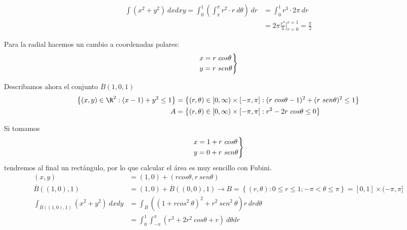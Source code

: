             \begin{sol}
                \begin{align*}
                    \label{}
                    \int (x^2 + y^2) \ dxdxy = \int_0^1 \left(  \int_{\pi}^{\pi} r^2 \cdot r \ d\theta \right) \ dr &= \int_0^1 r^3 \cdot 2\pi \ dr \\
                            &= 2\pi \frac{r^4}{4} \bigg\rbrack_{r=0}^{r=1} = \frac{\pi}{2}
                \end{align*}

                Para la radial hacemos un cambio a coordenadas polares: $$ \begin{rcases}
                    x = r \ cos \theta \\
                    y = r \ sen \theta
                \end{rcases}$$

                Describamos ahora el conjunto $\overline{B}(1, 0, 1)$ \begin{align*}
                    \label{}
                    \left\{ (x, y) \in \R^2 : (x-1) + y^2 \leq 1 \right\} &= \left\{ (r, \theta) \in [0, \infty) \times [-\pi, \pi] : (r \ cos \theta - 1)^2 + (r \ sen \theta)^2 \leq 1 \right\} \\
                        A &= \left\{ (r, \theta) \in [0, \infty) \times [-\pi, \pi] : r^2-2r \ cos \theta \leq 0 \right\}
                \end{align*}

                Si tomamos $$ \begin{rcases}
                    x = 1 + r \ cos \theta \\
                    y = 0 + r \ sen \theta
                \end{rcases}$$
                tendremos al final un rectángulo, por lo que calcular el área es muy sencillo con Fubini.
                \begin{align*}
                    \label{}
                    (x, y) &= (1, 0) + (r cos \theta, r \ sen \theta) \\
                    \overline{B}((1, 0), 1) &= (1, 0) + \overline{B} ((0, 0), 1) \rightarrow B = \left\{ (r, \theta) : 0 \leq r \leq 1; -\pi < \theta \leq \pi \right\} = [0, 1] \times (-\pi, \pi] \\
                    \int_{\overline{B}((1, 0), 1)}(x^2 + y^2) \ dxdy &= \int_B \left( (1 + rcos^2 \ \theta)^2 + r^2 \ sen^2 \ \theta \right) r \ drd\theta \\
                        &= \int_0^1 \int_{-\pi}^{\pi} (r^3 + 2r^2 \ cos \theta + r) \ d\theta dr
                \end{align*}
            \end{sol}

